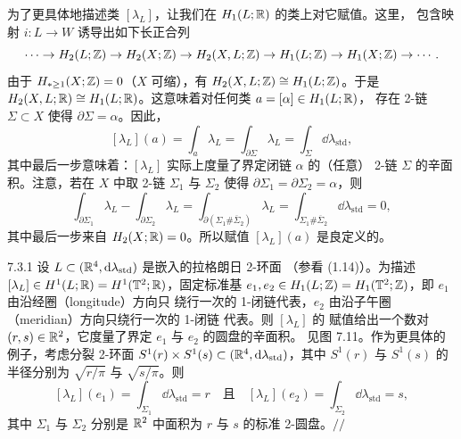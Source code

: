 为了更具体地描述类 $[\lambda_L]$，让我们在 $H_1(L;\mathbb{R})$ 的类上对它赋值。这里，
包含映射 $i\colon L\to W$ 诱导出如下长正合列
\[
  \cdots\to H_2(L;\mathbb{Z})\to H_2(X;\mathbb{Z})\to H_2(X,L;\mathbb{Z})
  \to H_1(L;\mathbb{Z})\to H_1(X;\mathbb{Z})\to\cdots.
\]
由于 $H_{*\ge1}(X;\mathbb{Z})=0$（$X$ 可缩），有 $H_2(X,L;\mathbb{Z})\cong H_1(L;\mathbb{Z})$。于是
$H_2(X,L;\mathbb{R})\cong H_1(L;\mathbb{R})$。这意味着对任何类 $a=[\alpha]\in H_1(L;\mathbb{R})$，
存在 2-链 $\Sigma\subset X$ 使得 $\partial\Sigma=\alpha$。因此，
\begin{equation}\tag{7.16}
  [\lambda_L](a)=\int_a\lambda_L
  =\int_{\partial\Sigma}\lambda_L=\int_\Sigma\dd\lambda_{\mathrm{std}},
\end{equation}
其中最后一步意味着：$[\lambda_L]$ 实际上度量了界定闭链 $\alpha$ 的（任意）
2-链 $\Sigma$ 的辛面积。注意，若在 $X$ 中取 2-链 $\Sigma_1$ 与 $\Sigma_2$ 使得
$\partial\Sigma_1=\partial\Sigma_2=\alpha$，则
\[
  \int_{\partial\Sigma_1}\lambda_L-\int_{\partial\Sigma_2}\lambda_L
  =\int_{\partial(\Sigma_1\#\overline{\Sigma}_2)}\lambda_L
  =\int_{\Sigma_1\#\overline{\Sigma}_2}\dd\lambda_{\mathrm{std}}=0,
\]
其中最后一步来自 $H_2(X;\mathbb{R})=0$。所以赋值 $[\lambda_L](a)$ 是良定义的。


\begin{wexam}{7.3.1}
  设 $L\subset(\mathbb{R}^4,\mathrm{d}\lambda_{\mathrm{std}})$ 是嵌入的拉格朗日 2-环面
  （参看 (1.14)）。为描述 $[\lambda_L]\in H^1(L;\mathbb{R})=H^1(\mathbb{T}^2;\mathbb{R})$，固定标准基
  $e_1,e_2\in H_1(L;\mathbb{Z})=H_1(\mathbb{T}^2;\mathbb{Z})$，即 $e_1$ 由沿经圈（longitude）方向只
  绕行一次的 1-闭链代表，$e_2$ 由沿子午圈（meridian）方向只绕行一次的 1-闭链
  代表。则 $[\lambda_L]$ 的
  赋值给出一个数对 $(r,s)\in\mathbb{R}^2$，它度量了界定 $e_1$ 与 $e_2$ 的圆盘的辛面积。
  见图 7.11。作为更具体的例子，考虑分裂 2-环面
  $S^1(r)\times S^1(s)\subset(\mathbb{R}^4,\mathrm{d}\lambda_{\mathrm{std}})$，其中 $S^1(r)$
  与 $S^1(s)$ 的半径分别为 $\sqrt{r/\pi}$ 与 $\sqrt{s/\pi}$。则
  \[
    [\lambda_L](e_1)=\int_{\Sigma_1}\dd\lambda_{\mathrm{std}}=r
    \quad\text{且}\quad
    [\lambda_L](e_2)=\int_{\Sigma_2}\dd\lambda_{\mathrm{std}}=s,
  \]
  其中 $\Sigma_1$ 与 $\Sigma_2$ 分别是 $\mathbb{R}^2$ 中面积为 $r$ 与 $s$ 的标准
  2-圆盘。\hfill$//$
\end{wexam}

